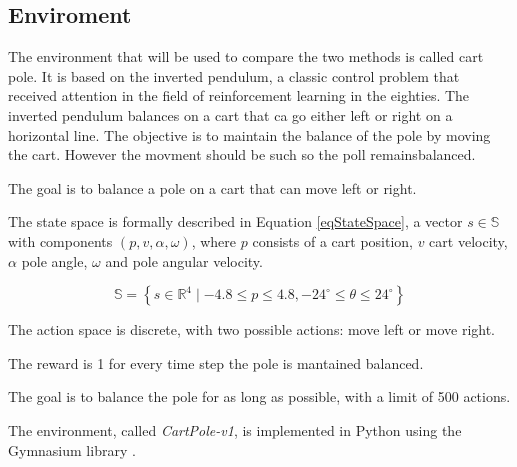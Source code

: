 \subsection{Enviroment}
The environment that will be used to compare the two methods is called cart pole. It is based on the inverted pendulum, a classic control problem that received attention in the field of reinforcement learning in the eighties. The inverted pendulum balances on a cart that ca go either left or right on a horizontal line. The objective is to maintain the balance of the pole by moving the cart. However the movment should be such so the poll remainsbalanced\cite{moriarty1996efficient}.

The goal is to balance a pole on a cart that can move left or right. 

The state space is formally described in Equation \ref{eqStateSpace}, a vector $s \in \mathbb{S}$ with components $(p, v, \alpha, \omega)$, where $p$ consists of a cart position, $v$ cart velocity, $\alpha$ pole angle, $\omega$ and pole angular velocity.

\begin{equation} \label{eqStateSpace}
{\mathbb{S} = \left\{ s \in \mathbb{R}^4 \mid -4.8 \leq p \leq 4.8, 
 -24^\circ \leq \theta \leq 24^\circ \right\}}
\end{equation}

The action space is discrete, with two possible actions: move left or move right. 

The reward is 1 for every time step the pole is mantained balanced.

The goal is to balance the pole for as long as possible, with a limit of 500 actions.

The environment, called \textit{CartPole-v1}, is implemented in Python using the Gymnasium library \cite{towers_gymnasium_2023}. 
